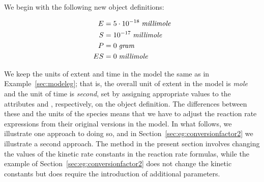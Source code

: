 We begin with the following new \Species object definitions:
\begin{linenomath}
  \begin{align*}
    E   & = 5 \cdot 10^{-18}\; \emph{millimole} \\
    S   & = 10^{-17}\; \emph{millimole} \\
    P   & = 0\; \emph{gram} \\
    ES  & = 0\; \emph{millimole}
  \end{align*}
\end{linenomath}
We keep the units of extent and time in the model the same as in
Example~\ref{sec:modeleg}; that is, the overall unit of extent in
the model is \emph{mole} and the unit of time is \emph{second},
set by assigning appropriate values to the attributes
 and , respectively, on the
\Model object definition.  The differences between these and the
units of the species means that we have to adjust the reaction
rate expressions from their original versions in the model.  In
what follows, we illustrate one approach to doing so, and in
Section~\ref{sec:eg:conversionfactor2} we illustrate a second
approach.  The method in the present section involves changing the
values of the kinetic rate constants in the reaction rate
formulas, while the example of
Section~\ref{sec:eg:conversionfactor2} does not change the kinetic
constants but does require the introduction of additional
parameters.

\newcommand{\veq}    {\ensuremath{v_\text{veq}}\xspace}
\newcommand{\vcat}   {\ensuremath{v_\text{vcat}}\xspace}
\newcommand{\Vcomp}  {\ensuremath{V_\text{comp}}\xspace}
\newcommand{\convE}  {\ensuremath{c_\species{E}}\xspace}
\newcommand{\convS}  {\ensuremath{c_\species{S}}\xspace}
\newcommand{\convP}  {\ensuremath{c_\species{P}}\xspace}
\newcommand{\convES} {\ensuremath{c_{\species{ES}}}\xspace}
\newcommand{\konnew} {\ensuremath{k_\text{on}^{*}}\xspace}
\newcommand{\koffnew}{\ensuremath{k_\text{off}^{*}}\xspace}
\newcommand{\kcatnew}{\ensuremath{k_\text{cat}^{*}}\xspace}

